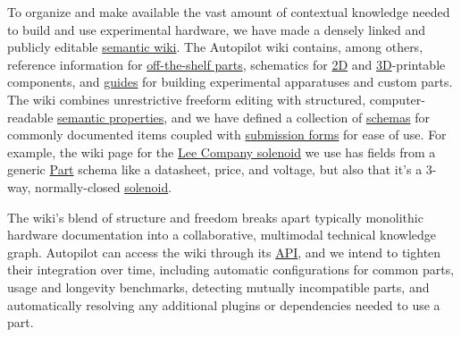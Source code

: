 To organize and make available the vast amount of contextual knowledge needed to build and use experimental hardware, we have made a densely linked and publicly editable \href{https://wiki.auto-pi-lot.com/index.php/Autopilot_Wiki}{semantic wiki}. The Autopilot wiki contains, among others, reference information for \href{https://wiki.auto-pi-lot.com/index.php/Parts}{off-the-shelf parts}, schematics for \href{https://wiki.auto-pi-lot.com/index.php/2D_CAD}{2D} and \href{https://wiki.auto-pi-lot.com/index.php/3D_CAD}{3D}-printable components, and \href{https://wiki.auto-pi-lot.com/index.php/Guides}{guides} for building experimental apparatuses and custom parts. The wiki combines unrestrictive freeform editing with structured, computer-readable \href{https://www.semantic-mediawiki.org/wiki/Semantic_MediaWiki}{semantic properties}, and we have defined a collection of \href{https://wiki.auto-pi-lot.com/index.php/Special:CategoryTree?target=Hardware&mode=categories&namespaces=&title=Special%3ACategoryTree}{schemas} for commonly documented items coupled with \href{https://wiki.auto-pi-lot.com/index.php/Special:Forms}{submission forms} for ease of use. For example, the wiki page for the \href{https://wiki.auto-pi-lot.com/index.php/Lee_LHDA0531115H}{Lee Company solenoid} we use has fields from a generic \href{https://wiki.auto-pi-lot.com/index.php/Category:Part}{Part} schema like a datasheet, price, and voltage, but also that it's a 3-way, normally-closed \href{https://wiki.auto-pi-lot.com/index.php/Category:Solenoid}{solenoid}. 

The wiki's blend of structure and freedom breaks apart typically monolithic hardware documentation into a collaborative, multimodal technical knowledge graph. Autopilot can access the wiki through its \href{https://docs.auto-pi-lot.com/en/latest/guide/plugins.html\#the-wiki-api}{API}, and we intend to tighten their integration over time, including automatic configurations for common parts, usage and longevity benchmarks, detecting mutually incompatible parts, and automatically resolving any additional plugins or dependencies needed to use a part.